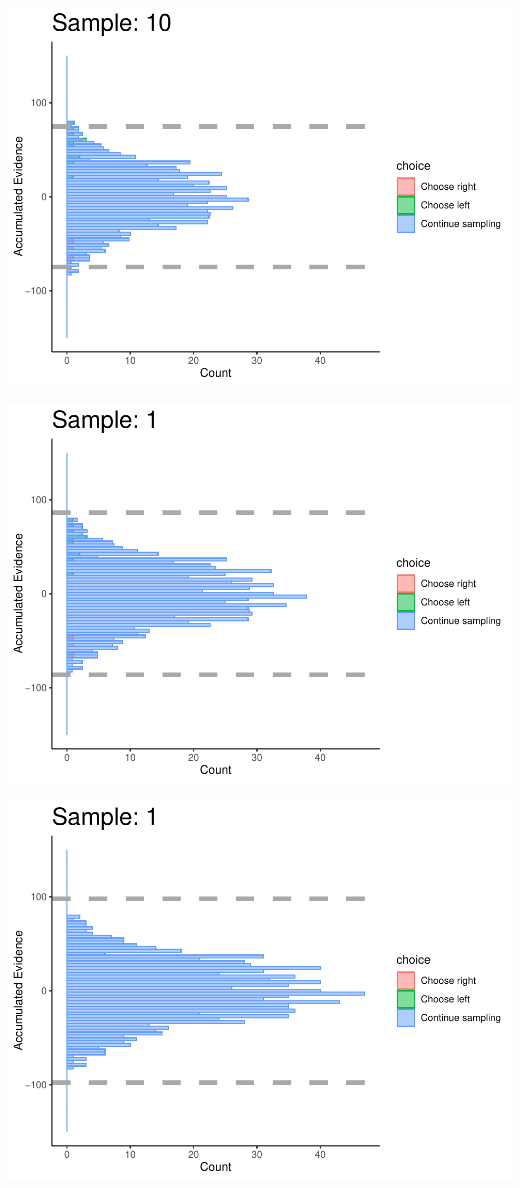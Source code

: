 \documentclass[
]{book}
\begin{document}
\begin{center}\includegraphics[width=0.8\linewidth]{LateNightBayes_files/figure-latex/collapsing_check-98} \end{center}

\begin{center}\includegraphics[width=0.8\linewidth]{LateNightBayes_files/figure-latex/collapsing_check-99} \end{center}

\begin{center}\includegraphics[width=0.8\linewidth]{LateNightBayes_files/figure-latex/collapsing_check-100} \end{center}
\end{document}
